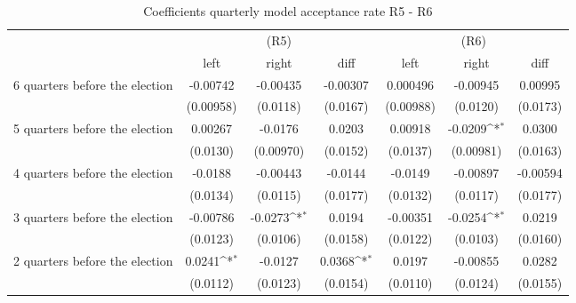 \begin{table}[!ht]\centering \footnotesize
\def\sym#1{\ifmmode^{#1}\else\(^{#1}\)\fi}
\caption{Coefficients quarterly model acceptance rate R5 - R6}
\begin{tabular}{l*{6}{c}}
\hline\hline
                    &\multicolumn{3}{c}{(R5)}&\multicolumn{3}{c}{(R6)}\\
&\multicolumn{1}{c}{left}&\multicolumn{1}{c}{right}&\multicolumn{1}{c}{diff}&\multicolumn{1}{c}{left}&\multicolumn{1}{c}{right}&\multicolumn{1}{c}{diff}\\
\hline
 6 quarters before the election&    -0.00742         &    -0.00435         &    -0.00307         &    0.000496         &    -0.00945         &     0.00995         \\
                    &   (0.00958)         &    (0.0118)         &    (0.0167)         &   (0.00988)         &    (0.0120)         &    (0.0173)         \\
[0,5em]
 5 quarters before the election&     0.00267         &     -0.0176         &      0.0203         &     0.00918         &     -0.0209\sym{*}  &      0.0300         \\
                    &    (0.0130)         &   (0.00970)         &    (0.0152)         &    (0.0137)         &   (0.00981)         &    (0.0163)         \\
[0,5em]
 4 quarters before the election&     -0.0188         &    -0.00443         &     -0.0144         &     -0.0149         &    -0.00897         &    -0.00594         \\
                    &    (0.0134)         &    (0.0115)         &    (0.0177)         &    (0.0132)         &    (0.0117)         &    (0.0177)         \\
[0,5em]
 3 quarters before the election&    -0.00786         &     -0.0273\sym{*}  &      0.0194         &    -0.00351         &     -0.0254\sym{*}  &      0.0219         \\
                    &    (0.0123)         &    (0.0106)         &    (0.0158)         &    (0.0122)         &    (0.0103)         &    (0.0160)         \\
[0,5em]
 2 quarters before the election&      0.0241\sym{*}  &     -0.0127         &      0.0368\sym{*}  &      0.0197         &    -0.00855         &      0.0282         \\
                    &    (0.0112)         &    (0.0123)         &    (0.0154)         &    (0.0110)         &    (0.0124)         &    (0.0155)         \\

\end{tabular}
\end{table}
